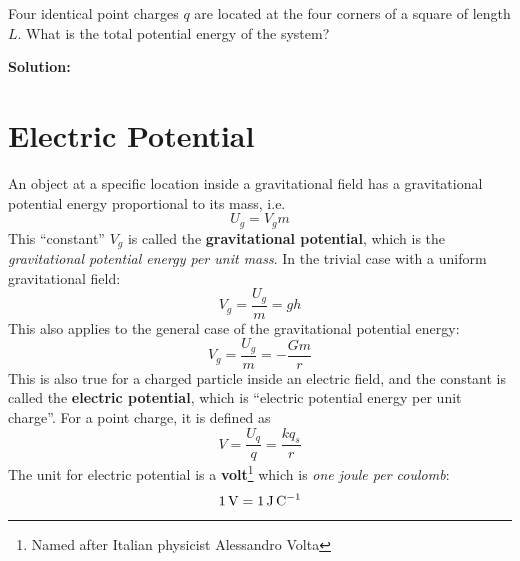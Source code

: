 \begin{example}
  Four identical point charges $q$ are located at the four corners of a square
  of length $L$. What is the total potential energy of the system?
  \begin{center}
    \vspace{-.2in}
  \end{center}
  \textbf{Solution:}
\end{example}



\section{Electric Potential}
An object at a specific location inside a gravitational field has a
gravitational potential energy proportional to its mass, i.e.\
\begin{equation}
  U_g=V_gm
\end{equation}
This ``constant'' $V_g$ is called the \textbf{gravitational potential}, which
is the \emph{gravitational potential energy per unit mass}. In the trivial case
with a uniform gravitational field:
\begin{equation}
  V_g=\frac{U_g}m=gh
\end{equation}
This also applies to the general case of the gravitational potential energy:
\begin{equation}
  V_g=\frac{U_g}m=-\frac{Gm}r
\end{equation}  
This is also true for a charged particle inside an electric field, and the
constant is called the \textbf{electric potential}, which is ``electric
potential energy per unit charge''. For a point charge, it is defined as
\begin{equation}
  \boxed{
    V=\frac{U_q}q=\frac{kq_s}r
  }
\end{equation}
The unit for electric potential is a \textbf{volt}\footnote{Named after
Italian physicist Alessandro Volta} which is \emph{one joule per coulomb}:
\begin{equation*}
  \SI1\volt=\SI1{\joule\per\coulomb}
\end{equation*}

